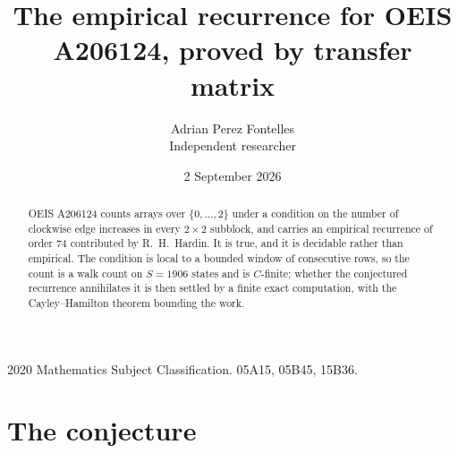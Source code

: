 \documentclass[11pt,a4paper]{article}
\title{The empirical recurrence for OEIS A206124, proved by transfer matrix}
\author{Adrian Perez Fontelles\\ \small Independent researcher}
\date{2 September 2026}
\theoremstyle{plain}
\theoremstyle{definition}
\begin{document}
\maketitle

\begin{abstract}
OEIS A206124 counts arrays over $\{0,\dots,2\}$ under a condition on the number of clockwise edge increases
in every $2\times2$ subblock, and carries an empirical recurrence of order $74$ contributed by
R.~H.~Hardin. It is true, and it is decidable rather than empirical. The condition is local to
a bounded window of consecutive rows, so the count is a walk count on $S=1906$ states and is
$C$-finite; whether the conjectured recurrence annihilates it is then settled by a finite exact
computation, with the Cayley--Hamilton theorem bounding the work.
\end{abstract}

\noindent\small 2020 Mathematics Subject Classification. 05A15, 05B45, 15B36.\normalsize

\section{The conjecture}
\end{document}
